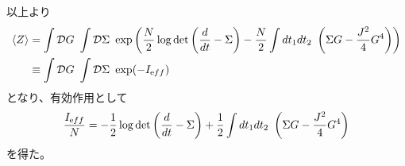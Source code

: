 	以上より
	\begin{align}
	\langle Z \rangle &= \int \mathcal{D}G \ \int \mathcal{D}\Sigma \ 
		\exp\left(
		\frac{N}{2}\log\det\left(\frac{d}{dt} - \Sigma\right)
		- \frac{N}{2}\int dt_1dt_2\ \left(\Sigma G - \frac{J^2}{4}G^4\right)
		\right)\nonumber\\
	&\equiv \int \mathcal{D}G \ \int \mathcal{D}\Sigma \ \exp(-I_{\mathrm eff})
	\end{align}
	となり、有効作用として
	\begin{align}
	\frac{I_{\mathrm eff}}{N} =
		- \frac{1}{2}\log\det\left(\frac{d}{dt} - \Sigma\right)
		+ \frac{1}{2}\int dt_1dt_2\ \left(\Sigma G - \frac{J^2}{4}G^4\right)
	\end{align}
	を得た。

	\pagebreak
